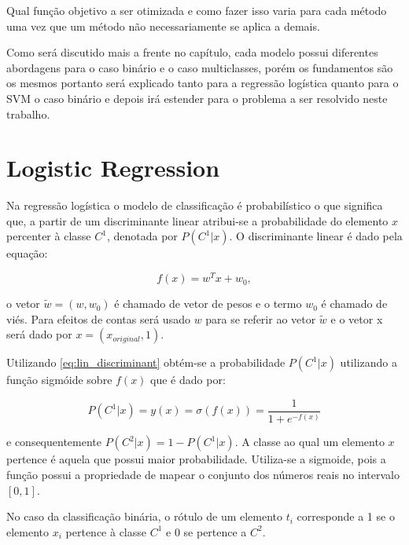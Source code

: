 Qual função objetivo a ser otimizada e como fazer isso varia para cada método uma vez que
um método não necessariamente se aplica a demais.

Como será discutido mais a frente no capítulo, cada modelo possui diferentes abordagens para o
caso binário e o caso multiclasses, porém os fundamentos são os mesmos portanto será explicado
tanto para a regressão logística quanto para o SVM o caso binário e depois irá estender para
o problema a ser resolvido neste trabalho.


\section{Logistic Regression}
\label{sec:logreg} 

Na regressão logística o modelo de classificação é probabilístico o que significa
que, a partir de um discriminante linear atribui-se a probabilidade do
elemento $x$ percenter à classe $C^1$, denotada por $P(C^1 | x)$. O discriminante
linear é dado pela equação: 
\begin{center}
	\begin{equation}
		\label{eq:lin_discriminant}
		f(x) = w^Tx + w_0,
	\end{equation}
\end{center}

o vetor $\tilde{w} = (w, w_0)$
é chamado de vetor de pesos e o termo $w_0$ é chamado de viés.
Para efeitos de contas
será usado $w$ para se referir ao vetor $\tilde{w}$ e o vetor x será dado por $x = (x_{original}, 1)$.

Utilizando \ref{eq:lin_discriminant} obtém-se a probabilidade $P(C^1 | x)$ utilizando a função sigmóide
sobre $f(x)$ que é dado por:

\begin{center}
	\begin{equation}
		\label{eq:sigmoid_y}
		P(C^1 | x) = y(x) = \sigma(f(x)) = \frac{1}{1 + e^{-f(x)}}
	\end{equation}
\end{center}
e consequentemente $P(C^2 | x) = 1 - P(C^1 | x)$.
A classe ao qual um elemento $x$ pertence é aquela que possui maior probabilidade. Utiliza-se
a sigmoide, pois a função possui a propriedade de mapear o conjunto dos números reais no intervalo
$[0, 1]$.

No caso da classificação binária, o rótulo de um elemento $t_i$ corresponde a 1 se o elemento $x_i$
pertence à classe $C^1$ e 0 se pertence a $C^2$.

